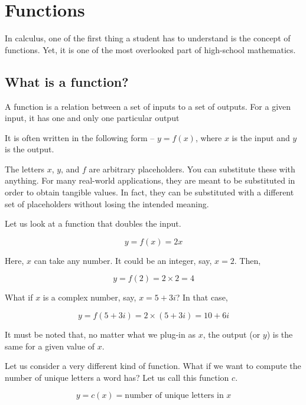 \chapter{Functions}
In calculus, one of the first thing a student has to understand is the concept of functions. Yet, it is one of the most overlooked part of high-school mathematics.

\section{What is a function?}

\begin{definition}[Function]
A function is a relation between a set of inputs to a set of outputs. For a given input, it has one and only one particular output
\end{definition}

It is often written in the following form -- $y = f(x)$, where $x$ is the input and $y$ is the output.

The letters $x$, $y$, and $f$ are arbitrary placeholders. You can substitute these with anything. For many real-world applications, they are meant to be substituted in order to obtain tangible values. In fact, they can be substituted with a different set of placeholders without losing the intended meaning.

Let us look at a function that doubles the input.

\begin{equation}
y = f(x) = 2x
\end{equation}

Here, $x$ can take any number. It could be an integer, say, $x = 2$. Then,

\[
y = f(2) = 2 \times 2 = 4
\]

What if $x$ is a complex number, say, $x = 5 + 3i$? In that case,

\[
y = f(5 + 3i) = 2 \times (5 + 3i) = 10 + 6i
\]

It must be noted that, no matter what we plug-in as $x$, the output (or $y$) is the same for a given value of $x$.

Let us consider a very different kind of function. What if we want to compute the number of unique letters a word has? Let us call this function $c$.

\begin{equation}
y = c(x) = \text{number of unique letters in $x$}
\label{eq:unique}
\end{equation}

